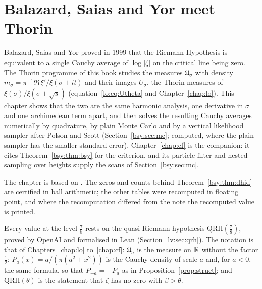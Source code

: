 \chapter{Balazard, Saias and Yor meet Thorin}\label{chap:bsy}\label{bsy:sec:intro}

Balazard, Saias and Yor \cite{BSY99} proved in 1999 that the Riemann Hypothesis is equivalent to a single Cauchy average of $\log|\zeta|$ on the critical line being zero. The Thorin programme of this book studies the measures $\mathfrak U_\sigma$ with density $m_\sigma=\pi^{-1}\Re\,\xi'/\xi(\sigma+it)$ and their images $U_\sigma$, the Thorin measures of $\xi(\sigma)/\xi(\sigma+\sqrt s)$ (equation~\eqref{lo:eq:Utheta} and Chapter~\ref{chap:lo}). This chapter shows that the two are the same harmonic analysis, one derivative in $\sigma$ and one archimedean term apart, and then solves the resulting Cauchy averages numerically by quadrature, by plain Monte Carlo and by a vertical likelihood sampler after Polson and Scott (Section~\ref{bsy:sec:mc}; computed, where the plain sampler has the smaller standard error). Chapter~\ref{chap:cf} is the companion: it cites Theorem~\ref{bsy:thm:bsy} for the criterion, and its particle filter and nested sampling over heights supply the scans of Section~\ref{bsy:sec:mc}.

The chapter is based on \cite{P26bsy}. The zeros and counts behind Theorem~\ref{bsy:thm:dhid} are certified in ball arithmetic; the other tables were recomputed in floating point, and where the recomputation differed from the note the recomputed value is printed.

Every value at the level $\frac78$ rests on the quasi Riemann hypothesis $\mathrm{QRH}(\frac78)$, proved by OpenAI \cite{OAI26a} and formalised in Lean (Section~\ref{lv:sec:qrh}). The notation is that of Chapters~\ref{chap:lo} to~\ref{chap:cf}: $\mathfrak U_\sigma$ is the measure on $\mathbb{R}$ without the factor $\frac12$; $P_a(x)=a/(\pi(a^2+x^2))$ is the Cauchy density of scale $a$ and, for $a<0$, the same formula, so that $P_{-a}=-P_a$ as in Proposition~\ref{prop:struct}; and $\mathrm{QRH}(\theta)$ is the statement that $\zeta$ has no zero with $\beta>\theta$.

